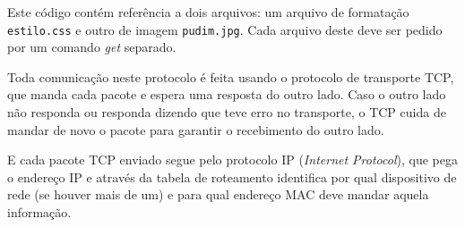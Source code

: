 Este código contém referência a dois arquivos: um arquivo de formatação \verb|estilo.css| e outro de imagem \verb|pudim.jpg|. Cada arquivo deste deve ser pedido por um comando \emph{get} separado.

Toda comunicação neste protocolo é feita usando o protocolo de transporte TCP, que manda cada pacote e espera uma resposta do outro lado. Caso o outro lado não responda ou responda dizendo que teve erro no transporte, o TCP cuida de mandar de novo o pacote para garantir o recebimento do outro lado.

E cada pacote TCP enviado segue pelo protocolo IP (\emph{Internet Protocol}), que pega o endereço IP e através da tabela de roteamento identifica por qual dispositivo de rede (se houver mais de um) e para qual endereço MAC deve mandar aquela informação.